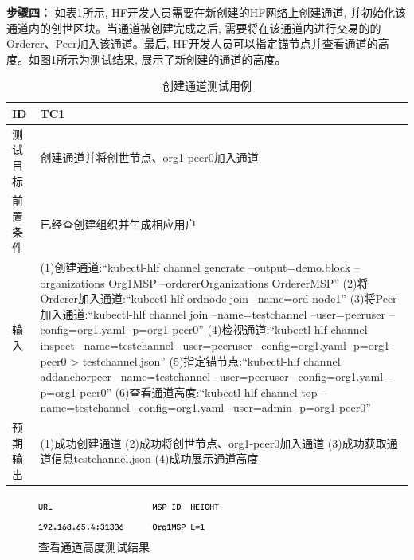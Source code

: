 \textbf{步骤四：} 如表\ref{channel_test}所示, HF开发人员需要在新创建的HF网络上创建通道, 并初始化该通道内的创世区块。当通道被创建完成之后, 需要将在该通道内进行交易的的Orderer、Peer加入该通道。最后, HF开发人员可以指定锚节点并查看通道的高度。如图\ref{channel_test_result}所示为测试结果, 展示了新创建的通道的高度。

{\footnotesize
\begin{longtable}[h]{m{60pt}|m{280pt}}
    \caption[创建通道测试用例]{创建通道测试用例} \label{channel_test}\\
        \hline  
        ID&TC1\\
        \hline
        测试目标&创建通道并将创世节点、org1-peer0加入通道\\
        \hline
        前置条件&已经查创建组织并生成相应用户\\
        \hline
        输入& (1)创建通道:“kubectl-hlf channel generate --output=demo.block --organizations Org1MSP --ordererOrganizations OrdererMSP”
        \newline (2)将Orderer加入通道:“kubectl-hlf ordnode join --name=ord-node1”
        \newline (3)将Peer加入通道:“kubectl-hlf channel join --name=testchannel --user=peeruser --config=org1.yaml -p=org1-peer0”
        \newline (4)检视通道:“kubectl-hlf channel inspect --name=testchannel --user=peeruser --config=org1.yaml -p=org1-peer0 > testchannel.json”
        \newline (5)指定锚节点:“kubectl-hlf channel addanchorpeer --name=testchannel --user=peeruser --config=org1.yaml -p=org1-peer0”
        \newline (6)查看通道高度:“kubectl-hlf channel top --name=testchannel --config=org1.yaml --user=admin -p=org1-peer0”\\

        \hline 
        预期输出& (1)成功创建通道
        \newline (2)成功将创世节点、org1-peer0加入通道
        \newline (3)成功获取通道信息testchannel.json
        \newline (4)成功展示通道高度\\
        \hline
    \end{longtable} 
}

\begin{figure}[h] %
    \centering %
    \includegraphics[width=0.55\textwidth]{FIGs/chapter5/channel.png} %
    \caption{查看通道高度测试结果} %
    \label{channel_test_result} %
\end{figure}%

